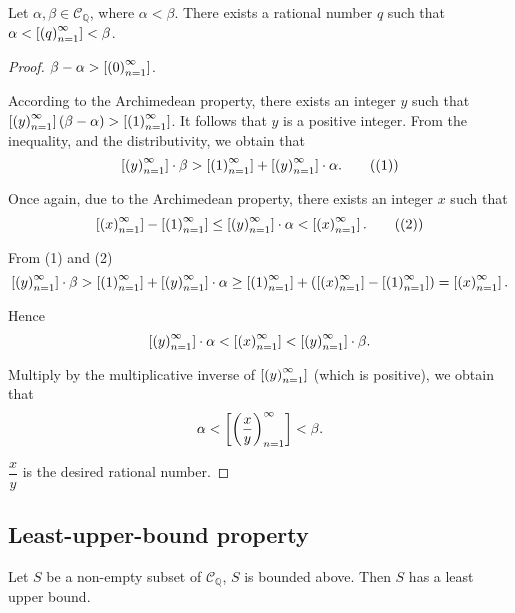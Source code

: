 \begin{theorem}\label{theorem:chapter1:archimedean-property-cauchy-sequence-equivalence-class}
    Let $\alpha, \beta\in\mathscr{C}_{\mathbb{Q}}$, where $\alpha < \beta$. There exists a rational number $q$ such that $\alpha < \left[{{\left({q}\right)}^{\infty}_{n=1}}\right] < \beta$.
\end{theorem}

\begin{proof}
    $\beta - \alpha > \left[{{\left({0}\right)}^{\infty}_{n=1}}\right]$.

    According to the Archimedean property, there exists an integer $y$ such that $\left[{{\left({y}\right)}^{\infty}_{n=1}}\right](\beta - \alpha) > \left[{{\left({1}\right)}^{\infty}_{n=1}}\right]$. It follows that $y$ is a positive integer. From the inequality, and the distributivity, we obtain that
    \begin{equation*}
        \left[{{\left({y}\right)}^{\infty}_{n=1}}\right]\cdot\beta > \left[{{\left({1}\right)}^{\infty}_{n=1}}\right] + \left[{{\left({y}\right)}^{\infty}_{n=1}}\right]\cdot\alpha.
        \tag{(1)}
    \end{equation*}

    Once again, due to the Archimedean property, there exists an integer $x$ such that
    \begin{equation*}
        \left[{{\left({x}\right)}^{\infty}_{n=1}}\right] - \left[{{\left({1}\right)}^{\infty}_{n=1}}\right] \le \left[{{\left({y}\right)}^{\infty}_{n=1}}\right]\cdot\alpha < \left[{{\left({x}\right)}^{\infty}_{n=1}}\right].
        \tag{(2)}
    \end{equation*}

    From (1) and (2)
    \[
        \left[{{\left({y}\right)}^{\infty}_{n=1}}\right]\cdot\beta > \left[{{\left({1}\right)}^{\infty}_{n=1}}\right] + \left[{{\left({y}\right)}^{\infty}_{n=1}}\right]\cdot\alpha \ge \left[{{\left({1}\right)}^{\infty}_{n=1}}\right] + (\left[{{\left({x}\right)}^{\infty}_{n=1}}\right] - \left[{{\left({1}\right)}^{\infty}_{n=1}}\right]) = \left[{{\left({x}\right)}^{\infty}_{n=1}}\right].
    \]

    Hence
    \[
        \left[{{\left({y}\right)}^{\infty}_{n=1}}\right]\cdot\alpha < \left[{{\left({x}\right)}^{\infty}_{n=1}}\right] < \left[{{\left({y}\right)}^{\infty}_{n=1}}\right]\cdot\beta.
    \]

    Multiply by the multiplicative inverse of $\left[{{\left({y}\right)}^{\infty}_{n=1}}\right]$ (which is positive), we obtain that
    \[
        \alpha < \left[{{\left({\frac{x}{y}}\right)}^{\infty}_{n=1}}\right] < \beta.
    \]

    $\dfrac{x}{y}$ is the desired rational number.
\end{proof}

\subsection{Least-upper-bound property}

\begin{theorem}\label{theorem:chapter1:cauchy-sequence-class-least-upper-bound}
    Let $S$ be a non-empty subset of $\mathscr{C}_{\mathbb{Q}}$, $S$ is bounded above. Then $S$ has a least upper bound.
\end{theorem}

